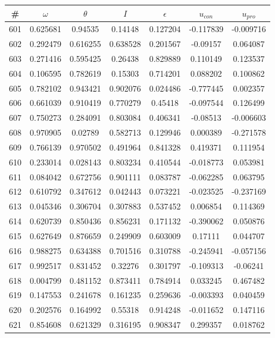 \begin{table}
\begin{tabular}{c|c|c|c|c|c|c}
\# & $\omega$ & $\theta$ & $I$ & $\epsilon$ & $u_{con}$ & $u_{pro}$\\
\hline
601 & 0.625681 & 0.94535 & 0.14148 & 0.127204 & -0.117839 & -0.009716\\
602 & 0.292479 & 0.616255 & 0.638528 & 0.201567 & -0.09157 & 0.064087\\
603 & 0.271416 & 0.595425 & 0.26438 & 0.829889 & 0.110149 & 0.123537\\
604 & 0.106595 & 0.782619 & 0.15303 & 0.714201 & 0.088202 & 0.100862\\
605 & 0.782102 & 0.943421 & 0.902076 & 0.024486 & -0.777445 & 0.002357\\
606 & 0.661039 & 0.910419 & 0.770279 & 0.45418 & -0.097544 & 0.126499\\
607 & 0.750273 & 0.284091 & 0.803084 & 0.406341 & -0.08513 & -0.006603\\
608 & 0.970905 & 0.02789 & 0.582713 & 0.129946 & 0.000389 & -0.271578\\
609 & 0.766139 & 0.970502 & 0.491964 & 0.841328 & 0.419371 & 0.111954\\
610 & 0.233014 & 0.028143 & 0.803234 & 0.410544 & -0.018773 & 0.053981\\
611 & 0.084042 & 0.672756 & 0.901111 & 0.083787 & -0.062285 & 0.063795\\
612 & 0.610792 & 0.347612 & 0.042443 & 0.073221 & -0.023525 & -0.237169\\
613 & 0.045346 & 0.306704 & 0.307883 & 0.537452 & 0.006854 & 0.114369\\
614 & 0.620739 & 0.850436 & 0.856231 & 0.171132 & -0.390062 & 0.050876\\
615 & 0.627649 & 0.876659 & 0.249909 & 0.603009 & 0.17111 & 0.044707\\
616 & 0.988275 & 0.634388 & 0.701516 & 0.310788 & -0.245941 & -0.057156\\
617 & 0.992517 & 0.831452 & 0.32276 & 0.301797 & -0.109313 & -0.06241\\
618 & 0.004799 & 0.481152 & 0.873411 & 0.784914 & 0.033245 & 0.467482\\
619 & 0.147553 & 0.241678 & 0.161235 & 0.259636 & -0.003393 & 0.040459\\
620 & 0.202576 & 0.164992 & 0.55318 & 0.914248 & -0.011652 & 0.147116\\
621 & 0.854608 & 0.621329 & 0.316195 & 0.908347 & 0.299357 & 0.018762\\

\end{tabular}
\end{table}
